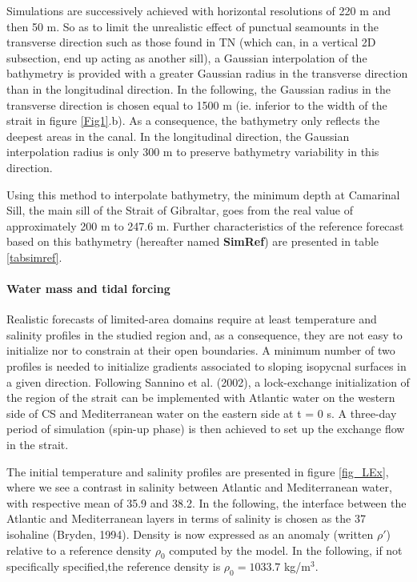 Simulations are successively achieved with horizontal resolutions of 220 m and then 50 m. So as to limit the unrealistic effect of punctual seamounts in the transverse direction such as those found in TN (which can, in a vertical 2D subsection, end up acting as another sill), a Gaussian interpolation of the bathymetry is provided with a greater Gaussian radius in the transverse direction than in the longitudinal direction. In the following, the Gaussian radius in the transverse direction is chosen equal to 1500 m (ie. inferior to the width of the strait in figure \ref{Fig1}.b). As a consequence, the bathymetry only reflects the deepest areas in the canal. 
In the longitudinal direction, the Gaussian interpolation radius is only 300 m to preserve bathymetry variability in this direction.

Using this method to interpolate bathymetry, the minimum depth at Camarinal Sill, the main sill of the Strait of Gibraltar, goes from the real value of approximately 200 m to 247.6 m. Further characteristics of the reference forecast based on this bathymetry (hereafter named \textbf{SimRef}) are presented in table \ref{tabsimref}.\\

\paragraph{Water mass and tidal forcing}
\indent Realistic forecasts of limited-area domains require at least temperature and salinity profiles in the studied region and, as a consequence, they are not easy to initialize nor to constrain at their open boundaries. A minimum number of two profiles is needed to initialize gradients associated to sloping isopycnal surfaces in a given direction. Following Sannino et al. (2002), a lock-exchange initialization of the region of the strait can be implemented with Atlantic water on the western side of CS and Mediterranean water on the eastern side at t = 0 s. A three-day period of simulation (spin-up phase) is then achieved to set up the exchange flow in the strait.

The initial temperature and salinity profiles are presented in figure \ref{fig_LEx}, where we see a contrast in salinity between Atlantic and Mediterranean water, with respective mean of 35.9 and 38.2. In the following, the interface between the Atlantic and Mediterranean layers in terms of salinity is chosen as the 37 isohaline (Bryden, 1994). Density is now expressed as an anomaly (written $\rho'$) relative to a reference density $\rho_{0}$ computed by the model. In the following, if not specifically specified,the reference density is $\rho_{0}=1033.7$ kg/m$^3$.

